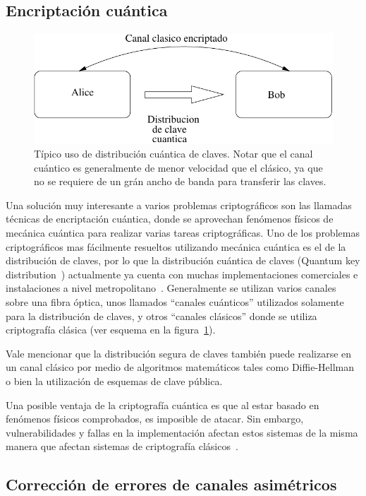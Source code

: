 \subsection{Encriptación cuántica}

\begin{figure}[t]
  \centering
  \includegraphics[width=0.7 \textwidth]{graphs/quantum} 
  \caption{Típico uso de distribución cuántica de claves. Notar que el canal cuántico es generalmente de menor velocidad que el clásico, ya que no se requiere de un grán ancho de banda para transferir las claves.}
  \label{fig_quant}
\end{figure}


\label{quantcry}
Una solución muy interesante a varios problemas criptográficos son las llamadas técnicas de encriptación cuántica, donde se aprovechan fenómenos físicos de mecánica cuántica para realizar varias tareas criptográficas.
Uno de los problemas criptográficos mas fácilmente resueltos utilizando mecánica cuántica es el de la distribución de claves, por lo que la distribución cuántica de claves (Quantum key distribution~\cite{grosshans2003quantum}) actualmente ya cuenta con muchas implementaciones comerciales e instalaciones a nivel metropolitano~\cite{sasaki2011field}. Generalmente se utilizan varios canales sobre una fibra óptica, unos llamados ``canales cuánticos'' utilizados solamente para la distribución de claves, y otros ``canales clásicos'' donde se utiliza criptografía clásica (ver esquema en la figura~\ref{fig_quant}).

Vale mencionar que la distribución segura de claves también puede realizarse en un canal clásico por medio de algoritmos matemáticos tales como Diffie-Hellman~\cite{diffie1976new} o bien la utilización de esquemas de clave pública.

Una posible ventaja de la criptografía cuántica es que al estar basado en fenómenos físicos comprobados, es imposible de atacar. Sin embargo, vulnerabilidades y fallas en la implementación afectan estos sistemas de la misma manera que afectan sistemas de criptografía clásicos~\cite{lydersen2010hacking}.


\subsection{Corrección de errores de canales asimétricos}

